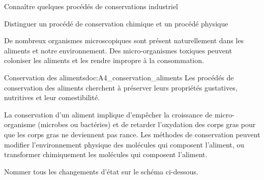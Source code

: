 \teteTermStssAlim



\begin{objectifs}
  \item Connaître quelques procédés de conservations industriel
  \item Distinguer un procédé de conservation chimique et un procédé physique
\end{objectifs}

\begin{contexte}
  De nombreux organismes microscopiques sont présent naturellement dans les aliments et notre environnement.
  Des micro-organismes toxiques peuvent coloniser les aliments et les rendre impropre à la consommation.

\end{contexte}


\begin{doc}{Conservation des aliments}{doc:A4_conservation_aliments}
  Les procédés de conservation des aliments cherchent à préserver leurs propriétés gustatives, nutritives et leur comestibilité.

  La conservation d'un aliment implique d'empêcher la croissance de micro-organisme (microbes ou bactéries) et de retarder l'oxydation des corps gras pour que les corps gras ne deviennent pas rance.
  Les méthodes de conservation peuvent modifier l'environnement physique des molécules qui composent l'aliment, ou transformer chimiquement les molécules qui composent l'aliment.
\end{doc}

\numeroQuestion Nommer tous les changements d'état sur le schéma ci-dessous.

\begin{center}
\end{center}


